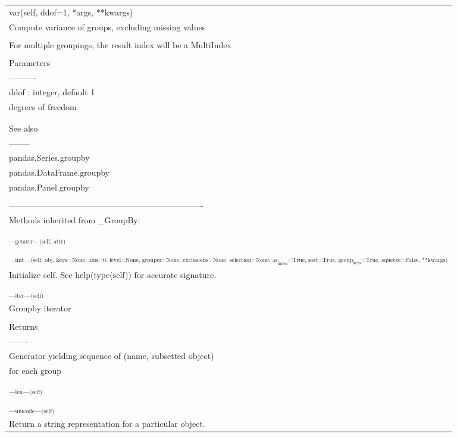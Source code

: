 \documentclass[11pt]{article}
\begin{document}
\begin{enumerate}
\begin{enumerate}
\begin{enumerate}
\begin{center}
\begin{tabular}{l}
\\
var(self, ddof=1, *args, **kwargs)\\
Compute variance of groups, excluding missing values\\
\\
For multiple groupings, the result index will be a MultiIndex\\
\\
Parameters\\
----------\\
ddof : integer, default 1\\
degrees of freedom\\
\\
\\
See also\\
--------\\
pandas.Series.groupby\\
pandas.DataFrame.groupby\\
pandas.Panel.groupby\\
\\
----------------------------------------------------------------------\\
Methods inherited from \_GroupBy:\\
\\
\_\(_{\text{getattr}}\)\_\(_{\text{(self, attr)}}\)\\
\\
\_\(_{\text{init}}\)\_\(_{\text{(self, obj, keys=None, axis=0, level=None, grouper=None, exclusions=None, selection=None, as}_{\text{index}}\text{=True, sort=True, group}_{\text{keys}}\text{=True, squeeze=False, **kwargs)}}\)\\
Initialize self.  See help(type(self)) for accurate signature.\\
\\
\_\(_{\text{iter}}\)\_\(_{\text{(self)}}\)\\
Groupby iterator\\
\\
Returns\\
-------\\
Generator yielding sequence of (name, subsetted object)\\
for each group\\
\\
\_\(_{\text{len}}\)\_\(_{\text{(self)}}\)\\
\\
\_\(_{\text{unicode}}\)\_\(_{\text{(self)}}\)\\
Return a string representation for a particular object.\\

\end{tabular}
\end{center}
\end{enumerate}
\end{enumerate}
\end{enumerate}
\end{document}
